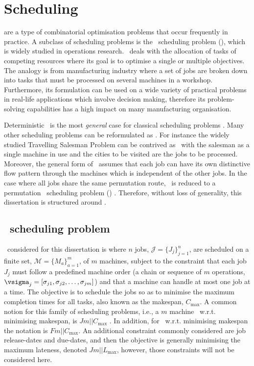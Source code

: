 
\chapter{Scheduling}\label{ch:scheduling}
 are a type of combinatorial optimisation problems that occur frequently in practice. A subclass of scheduling problems is the \jsp\ scheduling problem (\JSP), which is widely studied in operations research. \JSP\ deals with the allocation of tasks of competing resources where its goal is to optimise a single or multiple objectives. The analogy is from manufacturing industry where a set of jobs are broken down into tasks that must be processed on several machines in a workshop. 
Furthermore, its formulation can be used on a wide variety of practical problems in real-life applications which involve decision making, therefore its problem-solving capabilities has a high impact on many manufacturing organisation. %

Deterministic \JSP\ is the most \emph{general} case for classical scheduling problems \citep{Jain99}. Many other scheduling problems can be reformulated as \JSP. For instance the widely studied Travelling Salesman Problem can be contrived as \JSP\ with the salesman as a single machine in use and the cities to be visited are the jobs to be processed.
Moreover, the general form of \JSP\ assumes that each job can have its own distinctive flow pattern through the machines which is independent of the other jobs. In the case where all jobs share the same permutation route, \JSP\ is reduced to a permutation \fsp\ scheduling problem (\FSP) \citep{Guinet1998,Tay08}. Therefore, without loss of generality, this dissertation is structured around \JSP. 

\section{\Jsp\ scheduling problem}
\JSP\ considered for this dissertation is where $n$ jobs, $\mathcal{J}=\{J_j\}_{j=1}^n$, are scheduled on a finite set, $\mathcal{M}=\{M_a\}_{a=1}^m$, of $m$ machines, subject to the constraint that each job $J_j$ must follow a predefined machine order (a chain or sequence of $m$ operations, $\vsigma_j=[\sigma_{j1},\sigma_{j2},\dotsc,\sigma_{jm}]$) and that a machine can handle at most one job at a time. 
The objective is to schedule the jobs so as to minimise the maximum completion times for all tasks, also known as the makespan, $C_{\max}$. A common notion for this family of scheduling problems, i.e., a $m$ machine \JSP\ w.r.t. minimising makespan, is $Jm||C_{\max}$ \citep[cf.][]{Pinedo08}. In addition, for \FSP\ w.r.t. minimising makespan the notation is $Fm||C_{\max}$. 
An additional constraint commonly considered are job release-dates and due-dates, and then the objective is generally minimising the maximum lateness, denoted $Jm||L_{\max}$, however, those  constraints will not be considered here. 

